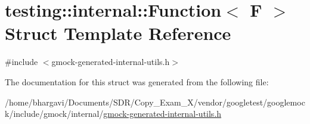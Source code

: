 \hypertarget{structtesting_1_1internal_1_1_function}{}\section{testing\+:\+:internal\+:\+:Function$<$ F $>$ Struct Template Reference}
\label{structtesting_1_1internal_1_1_function}


{\ttfamily \#include $<$gmock-\/generated-\/internal-\/utils.\+h$>$}



The documentation for this struct was generated from the following file\+:\begin{DoxyCompactItemize}
\item 
/home/bhargavi/\+Documents/\+S\+D\+R/\+Copy\+\_\+\+Exam\+\_\+X/vendor/googletest/googlemock/include/gmock/internal/\hyperlink{gmock-generated-internal-utils_8h}{gmock-\/generated-\/internal-\/utils.\+h}\end{DoxyCompactItemize}
